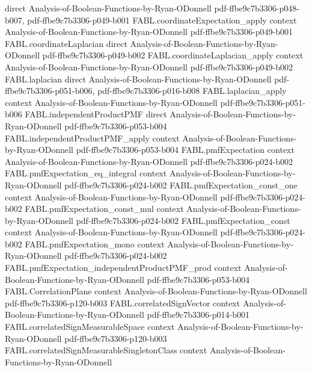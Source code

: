 \begin{theorem}
  {direct}
  {Analysis-of-Boolean-Functions-by-Ryan-ODonnell}
  {pdf-ffbe9c7b3306-p048-b007,
    pdf-ffbe9c7b3306-p049-b001}
\proofstep
  {FABL.coordinateExpectation_apply}
  {context}
  {Analysis-of-Boolean-Functions-by-Ryan-ODonnell}
  {pdf-ffbe9c7b3306-p049-b001}
\proofstep
  {FABL.coordinateLaplacian}
  {direct}
  {Analysis-of-Boolean-Functions-by-Ryan-ODonnell}
  {pdf-ffbe9c7b3306-p049-b002}
\proofstep
  {FABL.coordinateLaplacian_apply}
  {context}
  {Analysis-of-Boolean-Functions-by-Ryan-ODonnell}
  {pdf-ffbe9c7b3306-p049-b002}
\proofstep
  {FABL.laplacian}
  {direct}
  {Analysis-of-Boolean-Functions-by-Ryan-ODonnell}
  {pdf-ffbe9c7b3306-p051-b006,
    pdf-ffbe9c7b3306-p016-b008}
\proofstep
  {FABL.laplacian_apply}
  {context}
  {Analysis-of-Boolean-Functions-by-Ryan-ODonnell}
  {pdf-ffbe9c7b3306-p051-b006}
\proofstep
  {FABL.independentProductPMF}
  {direct}
  {Analysis-of-Boolean-Functions-by-Ryan-ODonnell}
  {pdf-ffbe9c7b3306-p053-b004}
\proofstep
  {FABL.independentProductPMF_apply}
  {context}
  {Analysis-of-Boolean-Functions-by-Ryan-ODonnell}
  {pdf-ffbe9c7b3306-p053-b004}
\proofstep
  {FABL.pmfExpectation}
  {context}
  {Analysis-of-Boolean-Functions-by-Ryan-ODonnell}
  {pdf-ffbe9c7b3306-p024-b002}
\proofstep
  {FABL.pmfExpectation_eq_integral}
  {context}
  {Analysis-of-Boolean-Functions-by-Ryan-ODonnell}
  {pdf-ffbe9c7b3306-p024-b002}
\proofstep
  {FABL.pmfExpectation_const_one}
  {context}
  {Analysis-of-Boolean-Functions-by-Ryan-ODonnell}
  {pdf-ffbe9c7b3306-p024-b002}
\proofstep
  {FABL.pmfExpectation_const_mul}
  {context}
  {Analysis-of-Boolean-Functions-by-Ryan-ODonnell}
  {pdf-ffbe9c7b3306-p024-b002}
\proofstep
  {FABL.pmfExpectation_const}
  {context}
  {Analysis-of-Boolean-Functions-by-Ryan-ODonnell}
  {pdf-ffbe9c7b3306-p024-b002}
\proofstep
  {FABL.pmfExpectation_mono}
  {context}
  {Analysis-of-Boolean-Functions-by-Ryan-ODonnell}
  {pdf-ffbe9c7b3306-p024-b002}
\proofstep
  {FABL.pmfExpectation_independentProductPMF_prod}
  {context}
  {Analysis-of-Boolean-Functions-by-Ryan-ODonnell}
  {pdf-ffbe9c7b3306-p053-b004}
\proofstep
  {FABL.CorrelationPlane}
  {context}
  {Analysis-of-Boolean-Functions-by-Ryan-ODonnell}
  {pdf-ffbe9c7b3306-p120-b003}
\proofstep
  {FABL.correlatedSignVector}
  {context}
  {Analysis-of-Boolean-Functions-by-Ryan-ODonnell}
  {pdf-ffbe9c7b3306-p014-b001}
\proofstep
  {FABL.correlatedSignMeasurableSpace}
  {context}
  {Analysis-of-Boolean-Functions-by-Ryan-ODonnell}
  {pdf-ffbe9c7b3306-p120-b003}
\proofstep
  {FABL.correlatedSignMeasurableSingletonClass}
  {context}
  {Analysis-of-Boolean-Functions-by-Ryan-ODonnell}

\end{theorem}
